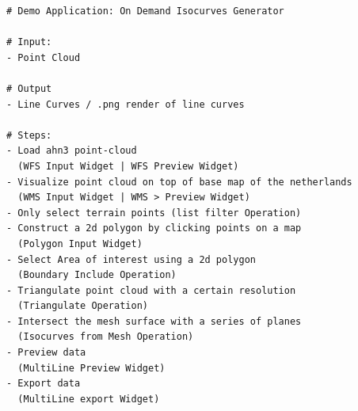 \begin{lstlisting}
# Demo Application: On Demand Isocurves Generator

# Input: 
- Point Cloud

# Output
- Line Curves / .png render of line curves

# Steps: 
- Load ahn3 point-cloud 
  (WFS Input Widget | WFS Preview Widget)
- Visualize point cloud on top of base map of the netherlands 
  (WMS Input Widget | WMS > Preview Widget)
- Only select terrain points (list filter Operation)
- Construct a 2d polygon by clicking points on a map 
  (Polygon Input Widget)
- Select Area of interest using a 2d polygon 
  (Boundary Include Operation)
- Triangulate point cloud with a certain resolution 
  (Triangulate Operation)
- Intersect the mesh surface with a series of planes 
  (Isocurves from Mesh Operation)
- Preview data 
  (MultiLine Preview Widget)
- Export data 
  (MultiLine export Widget)
\end{lstlisting}
